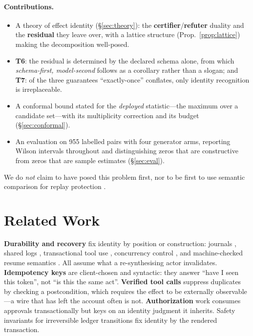 \documentclass[10pt,twocolumn]{article}
\theoremstyle{definition}
\theoremstyle{remark}
\begin{document}
\paragraph{Contributions.}
\begin{itemize}
\item A theory of effect identity (\S\ref{sec:theory}): the
\textbf{certifier}/\textbf{refuter} duality and the \textbf{residual} they leave
over, with a lattice structure (Prop.~\ref{prop:lattice}) making the
decomposition well-posed.
\item \textbf{T6}: the residual is determined by the declared schema alone, from
which \emph{schema-first, model-second} follows as a corollary rather than a
slogan; and \textbf{T7}: of the three guarantees ``exactly-once'' conflates,
only identity recognition is irreplaceable.
\item A conformal bound stated for the \emph{deployed} statistic---the maximum
over a candidate set---with its multiplicity correction and its budget
(\S\ref{sec:conformal}).
\item An evaluation on 955 labelled pairs with four generator arms, reporting
Wilson intervals throughout and distinguishing zeros that are constructive from
zeros that are sample estimates (\S\ref{sec:eval}).
\end{itemize}

We do \emph{not} claim to have posed this problem first, nor to be first to use
semantic comparison for replay protection \cite{ref14,ref5}.

\section{Related Work}

\textbf{Durability and recovery} fix identity by position or construction:
journals \cite{ref12}, shared logs \cite{ref16}, transactional tool use
\cite{ref4}, concurrency control \cite{ref6}, and machine-checked resume
semantics \cite{ref20}. All assume what a re-synthesising actor invalidates.
\textbf{Idempotency keys} \cite{ref11} are client-chosen and syntactic: they
answer ``have I seen this token'', not ``is this the same act''.
\textbf{Verified tool calls} \cite{ref5} suppress duplicates by checking a
postcondition, which requires the effect to be externally observable---a wire
that has left the account often is not. \textbf{Authorization} work
\cite{ref15,ref28} consumes approvals transactionally but keys on an identity
judgment it inherits. Safety invariants for irreversible ledger transitions
\cite{ref17} fix identity by the rendered transaction.
\end{document}
